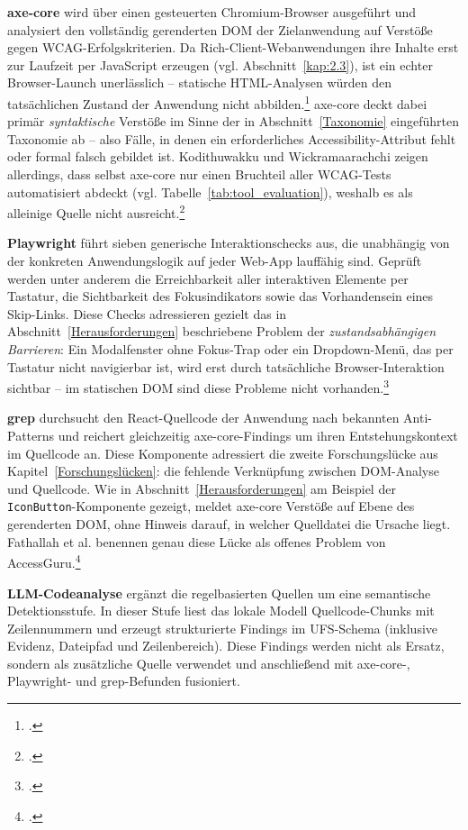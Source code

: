 \textbf{axe-core} wird über einen gesteuerten Chromium-Browser ausgeführt und analysiert den vollständig gerenderten \ac{DOM} der Zielanwendung auf Verstöße gegen \ac{WCAG}-Erfolgskriterien. Da Rich-Client-Webanwendungen ihre Inhalte erst zur Laufzeit per JavaScript erzeugen (vgl. Abschnitt~\ref{kap:2.3}), ist ein echter Browser-Launch unerlässlich -- statische \ac{HTML}-Analysen würden den tatsächlichen Zustand der Anwendung nicht abbilden.\footcite[Vgl.][]{fathallah_accessguru_2025} axe-core deckt dabei primär \textit{syntaktische} Verstöße im Sinne der in Abschnitt~\ref{Taxonomie} eingeführten Taxonomie ab -- also Fälle, in denen ein erforderliches Accessibility-Attribut fehlt oder formal falsch gebildet ist. Kodithuwakku und Wickramaarachchi zeigen allerdings, dass selbst axe-core nur einen Bruchteil aller \ac{WCAG}-Tests automatisiert abdeckt (vgl. Tabelle~\ref{tab:tool_evaluation}), weshalb es als alleinige Quelle nicht ausreicht.\footcite[Vgl.][]{kodithuwakku_assessing_2025}

\textbf{Playwright} führt sieben generische Interaktionschecks aus, die unabhängig von der konkreten Anwendungslogik auf jeder Web-App lauffähig sind. Geprüft werden unter anderem die Erreichbarkeit aller interaktiven Elemente per Tastatur, die Sichtbarkeit des Fokusindikators sowie das Vorhandensein eines Skip-Links. Diese Checks adressieren gezielt das in Abschnitt~\ref{Herausforderungen} beschriebene Problem der \textit{zustandsabhängigen Barrieren}: Ein Modalfenster ohne Fokus-Trap oder ein Dropdown-Menü, das per Tastatur nicht navigierbar ist, wird erst durch tatsächliche Browser-Interaktion sichtbar -- im statischen \ac{DOM} sind diese Probleme nicht vorhanden.\footcite[Vgl.][]{huang_access_2024}

\textbf{grep} durchsucht den React-Quellcode der Anwendung nach bekannten Anti-Patterns und reichert gleichzeitig axe-core-Findings um ihren Entstehungskontext im Quellcode an. Diese Komponente adressiert die zweite Forschungslücke aus Kapitel~\ref{Forschungslücken}: die fehlende Verknüpfung zwischen \ac{DOM}-Analyse und Quellcode. Wie in Abschnitt~\ref{Herausforderungen} am Beispiel der \texttt{IconButton}-Komponente gezeigt, meldet axe-core Verstöße auf Ebene des gerenderten \ac{DOM}, ohne Hinweis darauf, in welcher Quelldatei die Ursache liegt. Fathallah et al. benennen genau diese Lücke als offenes Problem von AccessGuru.\footcite[Vgl.][]{fathallah_accessguru_2025}

\textbf{LLM-Codeanalyse} ergänzt die regelbasierten Quellen um eine semantische Detektionsstufe. In dieser Stufe liest das lokale Modell Quellcode-Chunks mit Zeilennummern und erzeugt strukturierte Findings im \ac{UFS}-Schema (inklusive Evidenz, Dateipfad und Zeilenbereich). Diese Findings werden nicht als Ersatz, sondern als zusätzliche Quelle verwendet und anschließend mit axe-core-, Playwright- und grep-Befunden fusioniert.

